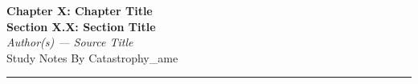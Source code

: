 \documentclass[11pt, a4paper]{article}
\begin{document}
\begin{center}
  {\LARGE \textbf{Chapter X: Chapter Title}} \\[4pt]
  {\LARGE \textbf{Section X.X: Section Title}} \\[6pt]
  {\large \textit{Author(s) --- Source Title}} \\[2pt]
  {\small Study Notes By Catastrophy\_ame}
\end{center}


\vspace{0.5em}
\hrule
\vspace{1em}

\end{document}

